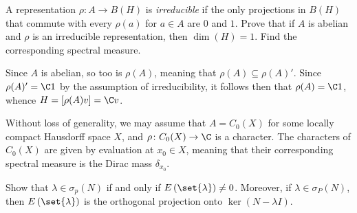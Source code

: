 \documentclass[10pt]{mypackage}
\begin{document}
\begin{problem}
  A representation $\rho\colon A\rightarrow B(H)$ is \textit{irreducible} if the only projections in $B(H)$ that commute with every $\rho(a)$ for $a\in A$ are $0$ and $1$. Prove that if $A$ is abelian and $\rho$ is an irreducible representation, then $\dim(H) = 1$. Find the corresponding spectral measure.
\end{problem}
\begin{solution}
  Since $A$ is abelian, so too is $\rho(A)$, meaning that $\rho(A)\subseteq \rho(A)'$. Since $\rho(A)' = \C 1$ by the assumption of irreducibility, it follows then that $\rho(A) = \C 1$, whence $H = [\rho(A) v] = \C v$.

  Without loss of generality, we may assume that $A = C_0(X)$ for some locally compact Hausdorff space $X$, and $\rho\colon C_0(X)\rightarrow \C$ is a character. The characters of $C_0(X)$ are given by evaluation at $x_0\in X$, meaning that their corresponding spectral measure is the Dirac mass $\delta_{x_0}$.
\end{solution}
\begin{problem}
  Show that $\lambda\in \sigma_p(N)$ if and only if $E\left( \set{\lambda} \right) \neq 0$. Moreover, if $\lambda\in \sigma_P(N)$, then $E\left(\set{\lambda}\right)$ is the orthogonal projection onto $\ker\left( N-\lambda I \right)$.
\end{problem}
\end{document}
